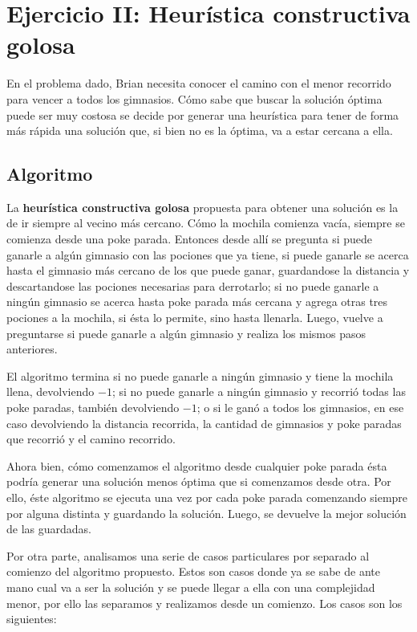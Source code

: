 \section{Ejercicio II: Heurística constructiva golosa}

En el problema dado, Brian necesita conocer el camino con el menor recorrido para vencer a todos los gimnasios. Cómo sabe que buscar la solución óptima puede ser muy costosa se decide por generar una heurística para tener de forma más rápida una solución que, si bien no es la óptima, va a estar cercana a ella.

\subsection{Algoritmo}

La \textbf{heurística constructiva golosa} propuesta para obtener una solución es la de ir siempre al vecino más cercano. Cómo la mochila comienza vacía, siempre se comienza desde una poke parada. Entonces desde allí se pregunta si puede ganarle a algún gimnasio con las pociones que ya tiene, si puede ganarle se acerca hasta el gimnasio más cercano de los que puede ganar, guardandose la distancia y descartandose las pociones necesarias para derrotarlo; si no puede ganarle a ningún gimnasio se acerca hasta poke parada más cercana y agrega otras tres pociones a la mochila, si ésta lo permite, sino hasta llenarla. Luego, vuelve a preguntarse si puede ganarle a algún gimnasio y realiza los mismos pasos anteriores.

El algoritmo termina si no puede ganarle a ningún gimnasio y tiene la mochila llena, devolviendo $-1$; si no puede ganarle a ningún gimnasio y recorrió todas las poke paradas, también devolviendo $-1$; o si le ganó a todos los gimnasios, en ese caso devolviendo la distancia recorrida, la cantidad de gimnasios y poke paradas que recorrió y el camino recorrido.

Ahora bien, cómo comenzamos el algoritmo desde cualquier poke parada ésta podría generar una solución menos óptima que si comenzamos desde otra. Por ello, éste algoritmo se ejecuta una vez por cada poke parada comenzando siempre por alguna distinta y guardando la solución. Luego, se devuelve la mejor solución de las guardadas. 

Por otra parte, analisamos una serie de casos particulares por separado al comienzo del algoritmo propuesto. Estos son casos donde ya se sabe de ante mano cual va a ser la solución y se puede llegar a ella con una complejidad menor, por ello las separamos y realizamos desde un comienzo. Los casos son los siguientes:

